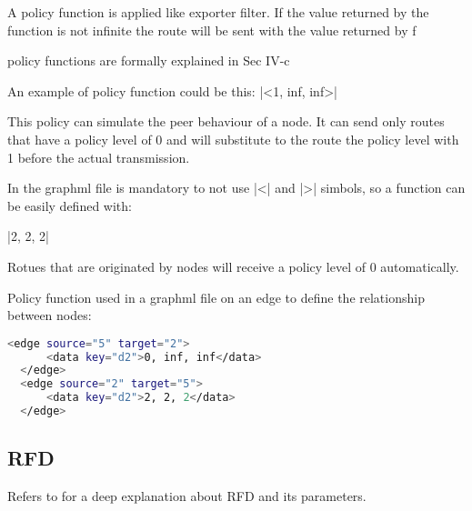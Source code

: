 \documentclass[10pt,journal,onecolumn]{IEEEtran}
\begin{document}
A policy function is applied like exporter filter. If the value returned by the 
function is not infinite the route will be sent with the value returned by f

policy functions are formally explained in  Sec IV-c

An example of policy function could be this: |<1, inf, inf>|

This policy can simulate the peer behaviour of a node. It can send only routes 
that have a policy level of 0 and will substitute to the route the policy level 
with 1 before the actual transmission.

In the graphml file is mandatory to not use |<| and |>| simbols, so a function can 
be easily defined with:

|2, 2, 2|

Rotues that are originated by nodes will receive a policy level of \num{0} automatically.

Policy function used in a graphml file on an edge to define the relationship
between nodes:
\begin{lstlisting}[language=bash]
  <edge source="5" target="2">
      <data key="d2">0, inf, inf</data>
  </edge>
  <edge source="2" target="5">
      <data key="d2">2, 2, 2</data>
  </edge>
\end{lstlisting}

\subsection{RFD}
\label{subsec:RFD}

Refers to  for a deep explanation about \ac{RFD} and its
parameters.
\end{document}

